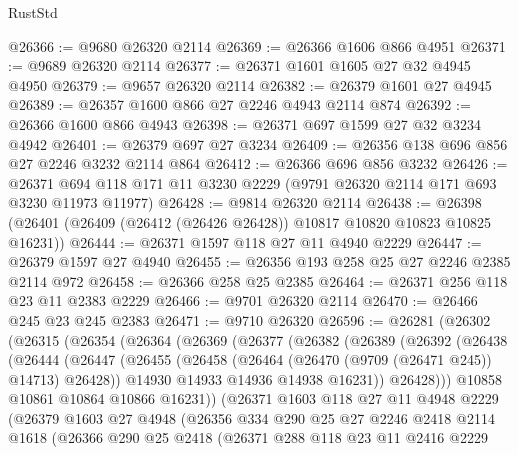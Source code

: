 \begin{lexlean}{RustStd}
\begin{coremodule}
@26366 := @9680 @26320 @2114
@26369 := @26366 @1606 @866 @4951
@26371 := @9689 @26320 @2114
@26377 := @26371 @1601 @1605 @27 @32 @4945 @4950
@26379 := @9657 @26320 @2114
@26382 := @26379 @1601 @27 @4945
@26389 := @26357 @1600 @866 @27 @2246 @4943 @2114 @874
@26392 := @26366 @1600 @866 @4943
@26398 := @26371 @697 @1599 @27 @32 @3234 @4942
@26401 := @26379 @697 @27 @3234
@26409 := @26356 @138 @696 @856 @27 @2246 @3232 @2114 @864
@26412 := @26366 @696 @856 @3232
@26426 := @26371 @694 @118 @171 @11 @3230 @2229 (@9791 @26320 @2114 @171 @693 @3230 @11973 @11977)
@26428 := @9814 @26320 @2114
@26438 := @26398 (@26401 (@26409 (@26412 (@26426 @26428)) @10817 @10820 @10823 @10825 @16231))
@26444 := @26371 @1597 @118 @27 @11 @4940 @2229
@26447 := @26379 @1597 @27 @4940
@26455 := @26356 @193 @258 @25 @27 @2246 @2385 @2114 @972
@26458 := @26366 @258 @25 @2385
@26464 := @26371 @256 @118 @23 @11 @2383 @2229
@26466 := @9701 @26320 @2114
@26470 := @26466 @245 @23 @245 @2383
@26471 := @9710 @26320
@26596 := @26281
    (@26302
      (@26315
        (@26354
          (@26364
            (@26369
              (@26377
                (@26382
                  (@26389
                    (@26392
                      (@26438
                        (@26444
                          (@26447
                            (@26455
                              (@26458 (@26464 (@26470 (@9709 (@26471 @245)) @14713) @26428))
                              @14930
                              @14933
                              @14936
                              @14938
                              @16231))
                          @26428)))
                    @10858
                    @10861
                    @10864
                    @10866
                    @16231))
                (@26371
                  @1603
                  @118
                  @27
                  @11
                  @4948
                  @2229
                  (@26379
                    @1603
                    @27
                    @4948
                    (@26356
                      @334
                      @290
                      @25
                      @27
                      @2246
                      @2418
                      @2114
                      @1618
                      (@26366
                        @290
                        @25
                        @2418
                        (@26371
                          @288
                          @118
                          @23
                          @11
                          @2416
                          @2229

\end{coremodule}
\end{lexlean}
